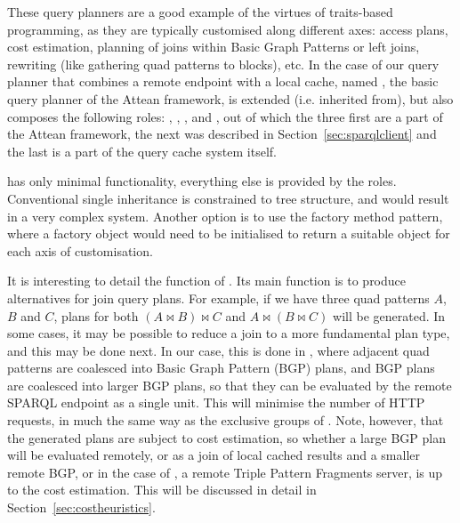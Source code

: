 \documentclass[a4paper, 12pt]{article}
\begin{document}
These query planners are a good example of the virtues of traits-based
programming, as they are typically customised along different axes:
access plans, cost estimation, planning of joins within Basic Graph
Patterns or left joins, rewriting (like gathering quad patterns to
blocks), etc. In the case of our query planner that combines a remote
endpoint with a local cache, named
, the basic query planner of the
Attean framework,  is extended
(i.e. inherited from), but also composes the following roles:
,
,
,
 and
, out of which the three
first are a part of the Attean framework, the next was described in
Section~\ref{sec:sparqlclient} and the last is a part of the
query cache system itself.


 has only minimal functionality,
everything else is provided by the roles. Conventional single
inheritance is constrained to tree structure, and would result in a
very complex system. Another option is to use the factory method
pattern, where a factory object would need to be initialised to return
a suitable object for each axis of customisation. 

It is interesting to detail the function of
. Its main function is to
produce alternatives for join query plans. For example, if we have
three quad patterns $A$, $B$ and $C$, plans for both $ ( A \bowtie B)
\bowtie C $ and $ A \bowtie ( B \bowtie C ) $ will be generated. In
some cases, it may be possible to reduce a join to a more fundamental
plan type, and this may be done next. In our case, this is done in
, where adjacent quad patterns
are coalesced into Basic Graph Pattern (BGP) plans, and BGP plans are
coalesced into larger BGP plans, so that they can be evaluated by the
remote SPARQL endpoint as a single unit. This will minimise the number
of HTTP requests, in much the same way as the exclusive groups of
\cite{springerlink:10.1007/978-3-642-25073-6-38}. Note, however, that
the generated plans are subject to cost estimation, so whether a large
BGP plan will be evaluated remotely, or as a join of local cached
results and a smaller remote BGP, or in the case of
, a remote Triple Pattern
Fragments server, is up to the cost estimation. This will be discussed
in detail in Section~\ref{sec:costheuristics}.
\end{document}
